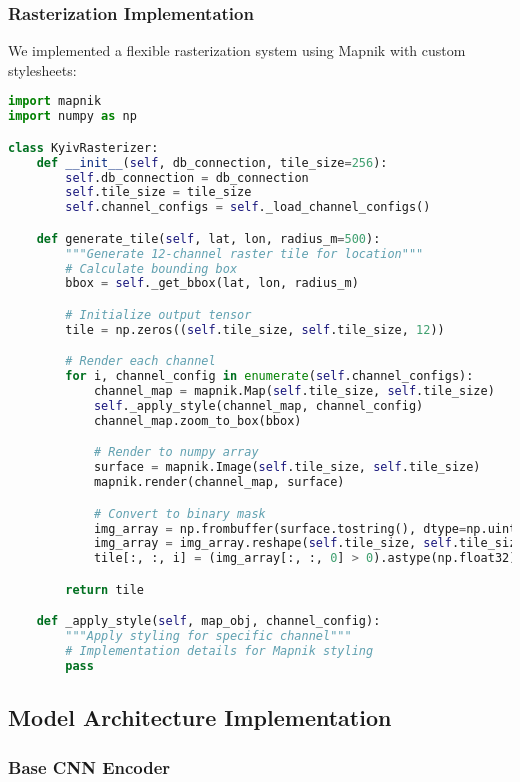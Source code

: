 \subsubsection{Rasterization Implementation}

We implemented a flexible rasterization system using Mapnik with custom stylesheets:

\begin{lstlisting}[language=Python, caption=Multi-channel Rasterization]
import mapnik
import numpy as np

class KyivRasterizer:
    def __init__(self, db_connection, tile_size=256):
        self.db_connection = db_connection
        self.tile_size = tile_size
        self.channel_configs = self._load_channel_configs()

    def generate_tile(self, lat, lon, radius_m=500):
        """Generate 12-channel raster tile for location"""
        # Calculate bounding box
        bbox = self._get_bbox(lat, lon, radius_m)

        # Initialize output tensor
        tile = np.zeros((self.tile_size, self.tile_size, 12))

        # Render each channel
        for i, channel_config in enumerate(self.channel_configs):
            channel_map = mapnik.Map(self.tile_size, self.tile_size)
            self._apply_style(channel_map, channel_config)
            channel_map.zoom_to_box(bbox)

            # Render to numpy array
            surface = mapnik.Image(self.tile_size, self.tile_size)
            mapnik.render(channel_map, surface)

            # Convert to binary mask
            img_array = np.frombuffer(surface.tostring(), dtype=np.uint8)
            img_array = img_array.reshape(self.tile_size, self.tile_size, 4)
            tile[:, :, i] = (img_array[:, :, 0] > 0).astype(np.float32)

        return tile

    def _apply_style(self, map_obj, channel_config):
        """Apply styling for specific channel"""
        # Implementation details for Mapnik styling
        pass
\end{lstlisting}

\subsection{Model Architecture Implementation}

\subsubsection{Base CNN Encoder}

